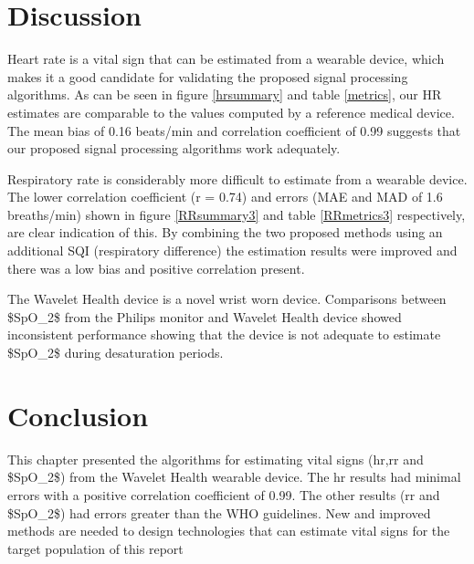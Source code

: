 \section{Discussion}

Heart rate is a vital sign that can be estimated from a wearable device, which makes it a good candidate for validating the proposed signal processing algorithms. As can be seen in figure \ref{hrsummary} and table \ref{metrics}, our HR estimates are comparable to the values computed by a reference medical device. The mean bias of 0.16 beats/min and correlation coefficient of 0.99 suggests that our proposed signal processing algorithms work adequately.

Respiratory rate is considerably more difficult to estimate from a wearable device. The lower correlation coefficient (r = 0.74) and errors (MAE and MAD of 1.6 breaths/min) shown in figure \ref{RRsummary3} and table \ref{RRmetrics3} respectively, are clear indication of this. By combining the two proposed methods using an additional SQI (respiratory difference) the estimation results were improved and there was a low bias and positive correlation present. 

The Wavelet Health device is a novel wrist worn device. Comparisons between \gls{$SpO_2$} from the Philips monitor and Wavelet Health device showed inconsistent performance showing that the device is not adequate to estimate \gls{$SpO_2$} during desaturation periods.

\section{Conclusion}

This chapter presented the algorithms for estimating vital signs (\gls{hr},\gls{rr} and \gls{$SpO_2$}) from the Wavelet Health wearable device. The \gls{hr} results had minimal errors with a positive correlation coefficient of 0.99. The other results (\gls{rr} and \gls{$SpO_2$}) had errors greater than the WHO guidelines. New and improved methods are needed to design technologies that can estimate vital signs for the target population of this report